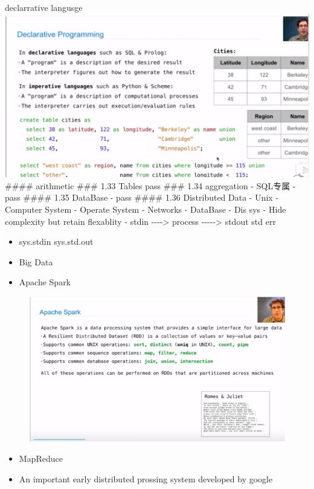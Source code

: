 \documentclass[11pt]{article}
\makeatletter
\def\maxwidth{\ifdim\Gin@nat@width>\linewidth\linewidth
    \else\Gin@nat@width\fi}
\let\Oldincludegraphics\includegraphics
\renewcommand{\includegraphics}[1]{\Oldincludegraphics[width=.8\maxwidth]{#1}}
\providecommand{\tightlist}{%
      \setlength{\itemsep}{0pt}\setlength{\parskip}{0pt}}
\makeatother
\begin{document}
declarrative langusge \includegraphics{./image/declarative.png} \#\#\#\#
arithmetic \#\#\# 1.33 Tables pass \#\#\# 1.34 aggregation - SQL专属 -
pass \#\#\#\# 1.35 DataBase - pass \#\#\#\# 1.36 Distributed Data - Unix
- Computer System - Operate System - Networks - DataBase - Dis sys -
Hide complexity but retain flexablity - stdin -\/-\/-\/-\textgreater{}
process -\/-\/-\/-\/-\textgreater{} stdout \textbar{} \textbar{} std err

\begin{itemize}
\tightlist
\item
  sys.stdin sys.std.out
\item
  Big Data
\item
  Apache Spark
\end{itemize}

\begin{figure}
\centering
\includegraphics{./image/DistributedDataset.png}
\caption{}
\end{figure}

\begin{itemize}
\tightlist
\item
  MapReduce
\item
  An important early distributed prossing system developed by google
\end{itemize}
\end{document}
